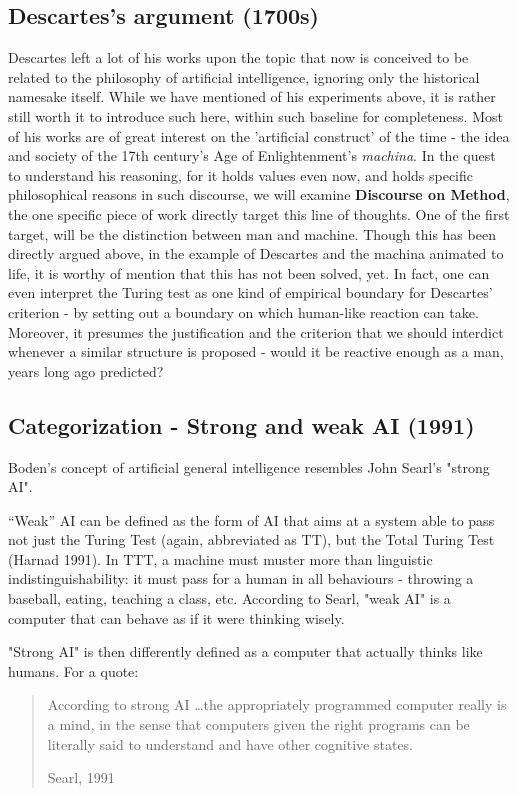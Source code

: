 \subsection{Descartes's argument (1700s)}
Descartes left a lot of his works upon the topic that now is conceived to be related to the philosophy of artificial intelligence, ignoring only the historical namesake itself. While we have mentioned of his experiments above, it is rather still worth it to introduce such here, within such baseline for completeness. Most of his works are of great interest on the 'artificial construct' of the time - the idea and society of the 17th century's Age of Enlightenment's \textit{machina}. In the quest to understand his reasoning, for it holds values even now, and holds specific philosophical reasons in such discourse, we will examine \textbf{Discourse on Method}, the one specific piece of work directly target this line of thoughts. One of the first target, will be the distinction between man and machine. Though this has been directly argued above, in the example of Descartes and the machina animated to life, it is worthy of mention that this has not been solved, yet. In fact, one can even interpret the Turing test as one kind of empirical boundary for Descartes' criterion - by setting out a boundary on which human-like reaction can take. Moreover, it presumes the justification and the criterion that we should interdict whenever a similar structure is proposed - would it be reactive enough as a man, years long ago predicted?
\subsection{Categorization - Strong and weak AI (1991)}
Boden's concept of artificial general intelligence resembles John Searl's "strong AI".

“Weak” AI can be defined as the form of AI that aims at a system able to pass not just the Turing Test (again, abbreviated as TT), but the Total Turing Test (Harnad 1991). In TTT, a machine must muster more than linguistic indistinguishability: it must pass for a human in all behaviours - throwing a baseball, eating, teaching a class, etc. According to Searl, "weak AI" is a computer that can behave as if it were thinking wisely.

"Strong AI" is then differently defined as a computer that actually thinks like humans. For a quote:

\blockquote[Searl, 1991]{According to strong AI \dots the appropriately programmed computer really is a mind, in the sense that computers given the right programs can be literally said to understand and have other cognitive states.}


